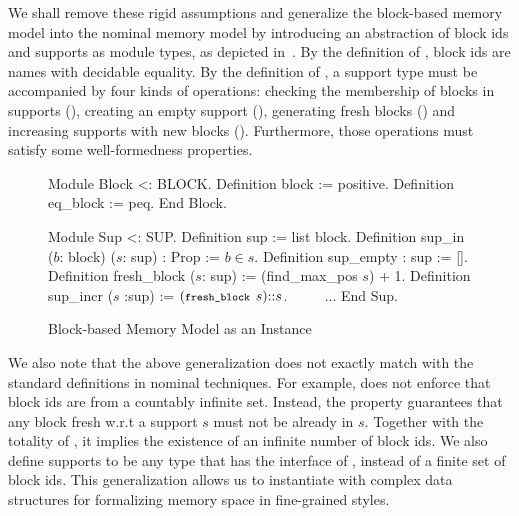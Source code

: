 We shall remove these rigid assumptions and generalize the block-based
memory model into the nominal memory model by introducing an
abstraction of block ids and supports as module types, as depicted
in~.
%
By the definition of , block ids are names with decidable equality.
%
By the definition of , a support type must be accompanied by
four kinds
of operations: checking the membership of blocks in supports
(), creating an empty support (),
generating fresh blocks () and increasing supports
with new blocks (). Furthermore, those operations must
satisfy some well-formedness properties. 

\begin{figure}
\begin{coq}
  Module Block <: BLOCK.
    Definition block := positive.         Definition eq_block := peq.
  End Block.

  Module Sup <: SUP.
    Definition sup := list block.         Definition sup_in ($b$: block) ($s$: sup) : Prop := $b \in s$.
    Definition sup_empty : sup := [].     Definition fresh_block ($s$: sup) := (find_max_pos $s$) + 1.
    Definition sup_incr ($s$ :sup) := $(\texttt{\footnotesize fresh\_block }s) \mathit{::} s$.   $\qquad$ ...
  End Sup.  
\end{coq}  
  \vspace{-0.2cm}
  \caption{Block-based Memory Model as an Instance}
  \vspace{-0.1cm}
  \label{fig:bm-instance}
\end{figure}

We also note that the above generalization does not exactly match with the
standard definitions in nominal techniques. For example,  does not
enforce that block ids are from a countably infinite set. Instead,
the  property guarantees that any block fresh w.r.t a
support $s$ must not be already in $s$. Together with the totality of
, it implies the existence of an infinite number of
block ids.
%
We also define supports to be any type that has the interface of
, instead of a finite set of block ids. This generalization
allows us to instantiate  with complex data structures for
formalizing memory space in fine-grained styles. 


